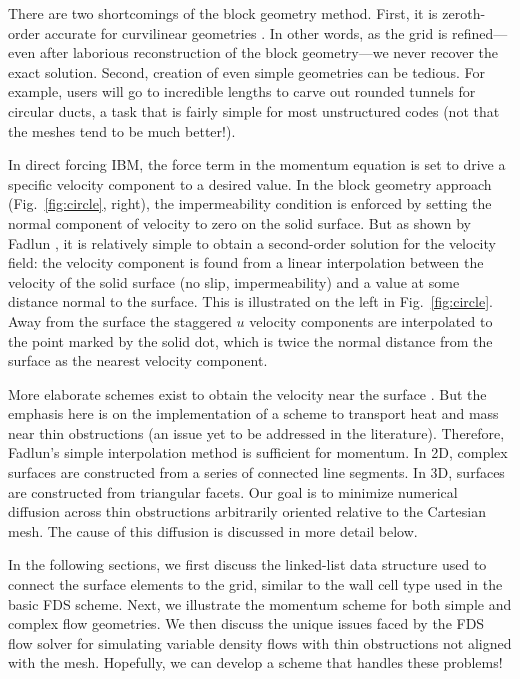 \documentclass[12pt]{article}
\begin{document}
There are two shortcomings of the block geometry method.  First, it is zeroth-order accurate for curvilinear geometries \cite{Fadlun:temp}.
In other words, as the grid is refined---even after laborious reconstruction of the block geometry---we never recover the exact solution.  Second, creation of even simple geometries can be tedious. For example, users will go to incredible lengths to carve out rounded tunnels for circular ducts, a task that is fairly simple for most unstructured codes (not that the meshes tend to be much better!).

In direct forcing IBM, the force term in the momentum equation is set to drive a specific velocity component to a desired value.  In the block geometry approach (Fig.~\ref{fig:circle}, right), the impermeability condition is enforced by setting the normal component of velocity to zero on the solid surface. But as shown by Fadlun \cite{Fadlun:temp}, it is relatively simple to obtain a second-order solution for the velocity field: the velocity component is found from a linear interpolation between the velocity of the solid surface (no slip, impermeability) and a value at some distance normal to the surface.  This is illustrated on the left in Fig.~\ref{fig:circle}.  Away from the surface the staggered $u$ velocity components are interpolated to the point marked by the solid dot, which is twice the normal distance from the surface as the nearest velocity component.

More elaborate schemes exist to obtain the velocity near the surface \cite{Balaras:temp,Choi:temp,McDermott:temp}.  But the emphasis here is on the implementation of a scheme to transport heat and mass near thin obstructions (an issue yet to be addressed in the literature).  Therefore, Fadlun's simple interpolation method is sufficient for momentum.   In 2D, complex surfaces are constructed from a series of connected line segments. In 3D, surfaces are constructed from triangular facets.  Our goal is to minimize numerical diffusion across thin obstructions arbitrarily oriented relative to the Cartesian mesh.  The cause of this diffusion is discussed in more detail below.

In the following sections, we first discuss the linked-list data structure used to connect the surface elements to the grid, similar to the wall cell type used in the basic FDS scheme.  Next, we illustrate the momentum scheme for both simple and complex flow geometries.  We then discuss the unique issues faced by the FDS flow solver for simulating variable density flows with thin obstructions not aligned with the mesh.  Hopefully, we can develop a scheme that handles these problems!
\end{document}
